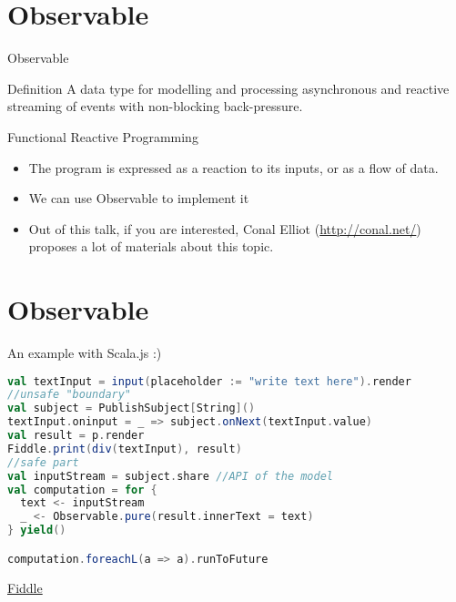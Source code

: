 \documentclass[presentation]{beamer}
\let\oldcite\cite
\renewcommand{\cite}[1]{{\color{blue}\oldcite{#1}}}
\begin{document}
\section{Observable}
\begin{frame}[fragile]{Observable}

\begin{block}{Definition}
A data type for modelling and processing asynchronous and reactive streaming of events with non-blocking back-pressure.
\end{block}

\begin{block}{Functional Reactive Programming \cite{wiki:functional} \cite{blackheath2016functional}}
  \begin{itemize}
    \item The program is expressed as a reaction to its inputs, or as a flow of data.
    \item We can use Observable to implement it
    \item Out of this talk, if you are interested, Conal Elliot (\url{http://conal.net/}) proposes a lot of materials about this topic.
  \end{itemize}
\end{block}

\end{frame}

\section{Observable}
\begin{frame}[fragile]{An example with Scala.js :)}
\begin{lstlisting}[language=Scala]
val textInput = input(placeholder := "write text here").render
//unsafe "boundary"
val subject = PublishSubject[String]() 
textInput.oninput = _ => subject.onNext(textInput.value)
val result = p.render
Fiddle.print(div(textInput), result)
//safe part
val inputStream = subject.share //API of the model
val computation = for {
  text <- inputStream
  _ <- Observable.pure(result.innerText = text)
} yield()

computation.foreachL(a => a).runToFuture
\end{lstlisting}  
\begin{center}
  \href{https://scalafiddle.io/sf/0uDr1Cr/1}{Fiddle}
\end{center}

\end{frame}
\end{document}
